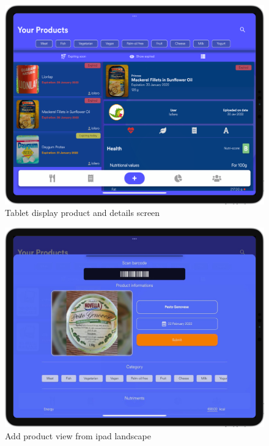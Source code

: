 \vspace*{-0.3cm}
\begin{figure}[H]
  \centering
    \includegraphics[scale=0.22]{./Images//Tablet_mocks/home1.png}
    \vspace*{-0.3cm}
    \caption{Tablet display product and details screen}
\end{figure}

\begin{figure}[H]
  \centering
    \includegraphics[scale=0.22]{./Images//Tablet_mocks/ipad_modal.png}
    \vspace*{-0.3cm}
    \caption{Add product view from ipad landscape}
\end{figure}
\restoregeometry


